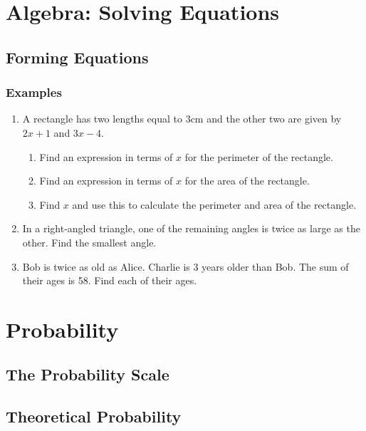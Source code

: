 \documentclass{article}
\begin{document}
\newpage

\section{Algebra: Solving Equations}

\newpage

\subsection{Forming Equations}

\subsubsection*{Examples}

\begin{enumerate}
    \item A rectangle has two lengths equal to 3cm and the other two are given by \(2x+1\) and \(3x-4\).
    \begin{enumerate}
        \item Find an expression in terms of \(x\) for the perimeter of the rectangle.
        \item Find an expression in terms of \(x\) for the area of the rectangle.
        \item Find \(x\) and use this to calculate the perimeter and area of the rectangle.
    \end{enumerate}
    \newpage
    \item In a right-angled triangle, one of the remaining angles is twice as large as the other. Find the smallest angle.
    \newpage
    \item Bob is twice as old as Alice. Charlie is 3 years older than Bob. The sum of their ages is 58. Find each of their ages.
\end{enumerate}

\newpage

\section{Probability}

\subsection{The Probability Scale}

\subsection{Theoretical Probability}
\end{document}
